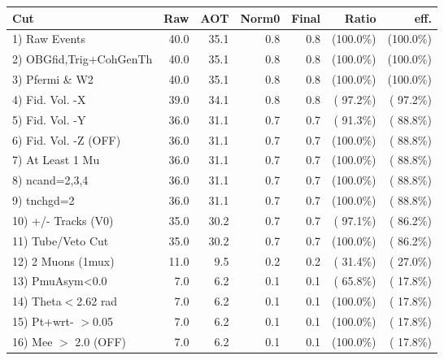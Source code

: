  \begin{table}[h!]\centering
 \begin{tabular}{||l||r|r|r|r|r|r||}
 \hline
 \hline
 Cut & Raw & AOT & Norm0 & Final & Ratio & eff.       \\
 \hline
  1) Raw Events           &         40.0 &         35.1 &          0.8 &          0.8 & (100.0\%) & (100.0\%) \\
  2) OBGfid,Trig+CohGenTh &         40.0 &         35.1 &          0.8 &          0.8 & (100.0\%) & (100.0\%) \\
  3) Pfermi \& W2         &         40.0 &         35.1 &          0.8 &          0.8 & (100.0\%) & (100.0\%) \\
  4) Fid. Vol. -X         &         39.0 &         34.1 &          0.8 &          0.8 & ( 97.2\%) & ( 97.2\%) \\
  5) Fid. Vol. -Y         &         36.0 &         31.1 &          0.7 &          0.7 & ( 91.3\%) & ( 88.8\%) \\
  6) Fid. Vol. -Z (OFF)   &         36.0 &         31.1 &          0.7 &          0.7 & (100.0\%) & ( 88.8\%) \\
  7) At Least 1 Mu        &         36.0 &         31.1 &          0.7 &          0.7 & (100.0\%) & ( 88.8\%) \\
  8) ncand=2,3,4          &         36.0 &         31.1 &          0.7 &          0.7 & (100.0\%) & ( 88.8\%) \\
  9) tnchgd=2             &         36.0 &         31.1 &          0.7 &          0.7 & (100.0\%) & ( 88.8\%) \\
 10) +/- Tracks (V0)      &         35.0 &         30.2 &          0.7 &          0.7 & ( 97.1\%) & ( 86.2\%) \\
 11) Tube/Veto Cut        &         35.0 &         30.2 &          0.7 &          0.7 & (100.0\%) & ( 86.2\%) \\
 12) 2 Muons (1mux)       &         11.0 &          9.5 &          0.2 &          0.2 & ( 31.4\%) & ( 27.0\%) \\
 13) PmuAsym<0.0          &          7.0 &          6.2 &          0.1 &          0.1 & ( 65.8\%) & ( 17.8\%) \\
 14) Theta$<$2.62 rad     &          7.0 &          6.2 &          0.1 &          0.1 & (100.0\%) & ( 17.8\%) \\
 15) Pt+wrt- $>$0.05      &          7.0 &          6.2 &          0.1 &          0.1 & (100.0\%) & ( 17.8\%) \\
 16) Mee $>$ 2.0  (OFF)   &          7.0 &          6.2 &          0.1 &          0.1 & (100.0\%) & ( 17.8\%) \\

\end{tabular}
\end{table}
